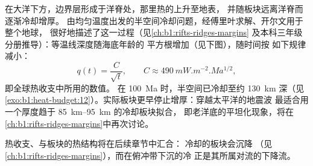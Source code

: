 在大洋下方，边界层形成于洋脊处，那里热的上升至地表，
并随板块远离洋脊而逐渐冷却增厚。
由均匀温度出发的半空间冷却问题，经傅里叶求解、开尔文用于整个地球，
很好地描述了这一过程（见\cref{ch:b1:rifts-ridges-margins}
及本科三年级分册推导）：等温线深度随海底年龄的
平方根增加（见下图），随时间按
如下规律减小：
\[
  q(t) = \frac{C}{\sqrt t}, \qquad C \approx \qty{490}{mW.m^{-2}.Ma^{1/2}},
\]
即全球热收支中所用的数值。 %
在 \qty{100}{Ma} 时，半空间已冷却至约 \qty{130}{km} 深（见\cref{exo:b1:heat-budget:12}）。实际板块更早停止增厚：穿越太平洋的地震波
最适合用一个厚度趋于
\qtyrange{85}{95}{km} 的冷却板块拟合，
即老洋底的平坦化现象，将在\cref{ch:b1:rifts-ridges-margins}中再次讨论。

热收支、与板块的热结构将在后续章节中汇合：
冷却的板块会沉降
（见\cref{ch:b1:rifts-ridges-margins}），而在俯冲带下沉的冷
正是其所属对流的下降流。

